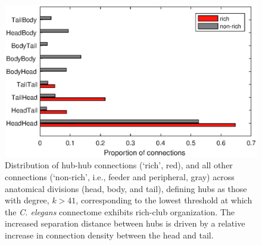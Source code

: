 \documentclass[10pt,letterpaper]{article}
\begin{document}
\begin{figure}[h]
\centering
    \includegraphics[width=1\textwidth]{connectionProportionDivision.eps}
\caption{
\label{fig:S_connectionProportion}
Distribution of hub-hub connections (`rich', red), and all other connections (`non-rich', i.e., feeder and peripheral, gray) across anatomical divisions (head, body, and tail), defining hubs as those with degree, $k > 41$, corresponding to the lowest threshold at which the \emph{C. elegans} connectome exhibits rich-club organization.
The increased separation distance between hubs is driven by a relative increase in connection density between the head and tail.
}
\end{figure}
\end{document}

